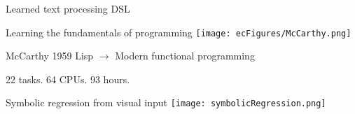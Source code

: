 \documentclass{beamer}
\begin{document}
\begin{frame}{Learned text processing DSL}

\end{frame}

\begin{frame}{Learning the fundamentals of programming}
  \texttt{[image: ecFigures/McCarthy.png]}

\centering  McCarthy 1959 Lisp  $\longrightarrow$ Modern functional programming
  
  22 tasks. 64 CPUs. 93 hours.

  \end{frame}

\begin{frame}{Symbolic regression from visual input}
\centering\texttt{[image: symbolicRegression.png]}
\end{frame}
\end{document}
